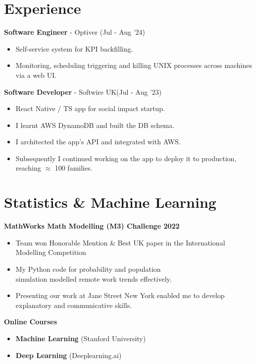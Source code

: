\documentclass{Resume}
\begin{document}
        \section{Experience}
            \textbf{Software Engineer} - Optiver \hfill (Jul - Aug '24)
                \begin{itemize}
                    \item Self-service system for KPI backfilling.
                    \item Monitoring, scheduling triggering and killing UNIX processes across machines via a web UI.
                \end{itemize}            
            \textbf{Software Developer} - Softwire UK\hfill (Jul - Aug '23)
            \begin{itemize}
                \item React Native / TS app for social impact startup.
                \item I learnt AWS DynamoDB and built the DB schema.
                \item I architected the app's API and integrated with AWS.
                \item Subsequently I continued working on the app to deploy it to production, reaching  $\approx$ 100 families.  

            \end{itemize}

	\section{Statistics \& Machine Learning}
			\textbf{MathWorks Math Modelling (M3) Challenge 2022} 
			\begin{itemize}
                \item Team won Honorable Mention \& Best UK paper in the International Modelling Competition
			    \item My Python code for probability and population \\ simulation modelled remote work trends effectively.
			    \item Presenting our work at Jane Street New York enabled me to develop explanatory and communicative skills.
			\end{itemize}
            \textbf{Online Courses}
                \begin{itemize}
                    \item \textbf{Machine Learning} (Stanford University)
                    \item \textbf{Deep Learning} (Deeplearning.ai)
                \end{itemize}
\end{document}
